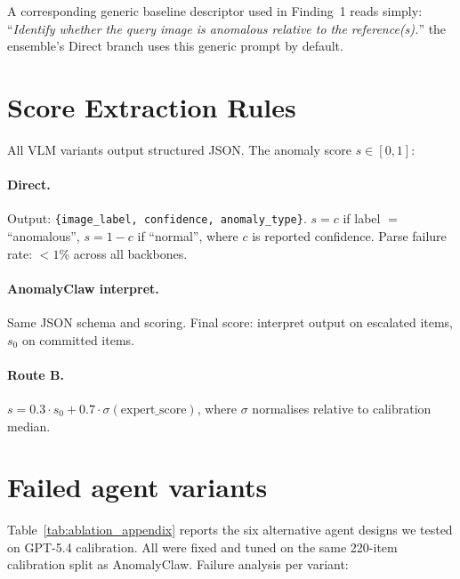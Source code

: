 A corresponding generic baseline descriptor used in Finding~1 reads simply: ``\emph{Identify whether the query image is anomalous relative to the reference(s).}''  the ensemble's Direct branch uses this generic prompt by default.

\section{Score Extraction Rules}
\label{app:scoring}

All VLM variants output structured JSON. The anomaly score $s \in [0, 1]$:

\paragraph{ Direct.}
Output: \texttt{\{image\_label, confidence, anomaly\_type\}}.
$s = c$ if label $=$ ``anomalous'', $s = 1{-}c$ if ``normal'', where $c$ is reported confidence. Parse failure rate: $<1\%$ across all backbones.

\paragraph{AnomalyClaw interpret.}
Same JSON schema and scoring. Final score: interpret output on escalated items, $s_0$ on committed items.

\paragraph{Route B.}
$s = 0.3 \cdot s_0 + 0.7 \cdot \sigma(\text{expert\_score})$, where $\sigma$ normalises relative to calibration median.

\section{Failed agent variants}
\label{app:ablation}

Table~\ref{tab:ablation_appendix} reports the six alternative agent designs we tested on GPT-5.4 calibration. All were fixed and tuned on the same 220-item calibration split as AnomalyClaw. Failure analysis per variant:

